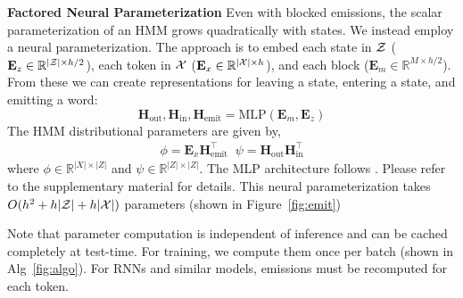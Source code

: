 \documentclass[11pt,a4paper]{article}
\begin{document}
\vspace{0.2cm}


\noindent
\textbf{Factored Neural Parameterization} Even with blocked emissions, the scalar parameterization of an HMM grows quadratically
with states.
We instead employ a neural parameterization.
The approach is to embed each state in $\cal Z$ ($\mathbf{E}_z \in \mathbb{R}^{|\mathcal{Z}| \times h/2}$),
each token in $\cal X$ ($\mathbf{E}_x \in \mathbb{R}^{|\mathcal{X}| \times h}$),
and each block ($\mathbf{E}_m \in \mathbb{R}^{M \times h/2}$).
From these we can create representations for leaving a state, entering a state,
and emitting a word: 
\[ \mathbf{H}_{\textrm{out}},\mathbf{H}_{\textrm{in}},\mathbf{H}_\textrm{emit}
 = \text{MLP}(\mathbf{E}_m, \mathbf{E}_z ) \] 
The HMM distributional parameters are given by,
\begin{equation}
\begin{aligned}
\phi = \mathbf{E}_x \mathbf{H}_\textrm{emit}^\top \;\; 
\psi = \mathbf{H}_\textrm{out} \mathbf{H}_\textrm{in}^\top
\end{aligned}
\end{equation}
where $\phi \in \mathbb{R}^{|X|\times|Z|}$ and
$\psi \in \mathbb{R}^{|Z|\times|Z|}$.
The MLP architecture follows \cite{kim2019cpcfg}.
Please refer to the supplementary material for details. 
This neural parameterization takes $O(h^2 + h|\mathcal{Z}| + h|\mathcal{X}|)$ parameters (shown in Figure~\ref{fig:emit})


Note that parameter computation is independent of inference and can be cached completely at test-time.
For training, we compute them once per batch (shown in Alg~\ref{fig:algo}). 
For RNNs and similar models, %
emissions must be recomputed for each token. 
\end{document}
